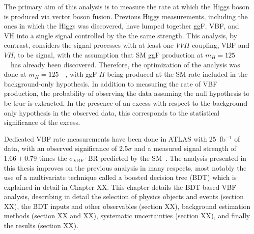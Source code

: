 
The primary aim of this analysis is to measure the rate at which the
Higgs boson is produced via vector boson fusion. Previous Higgs
measurements, including the ones in which the Higgs was discovered,
have lumped together ggF, VBF, and VH into a single signal controlled
by the the same strength. This analysis, by contrast, considers the
signal processes with at least one $VVH$ coupling, VBF and $VH$, to be
signal, with the assumption that SM ggF production at
$m_H=125$~\gev~has already been discovered. Therefore, the
optimization of the analysis was done at $m_H=125$~\gev~, with ggF $H$
being produced at the SM rate included in the background-only hypothesis. In
addition to measuring the rate of VBF production, the probability of
observing the data assuming the null hypothesis to be true is
extracted. In the presence of an excess with respect to the
background-only hypothesis in the observed data, this
corresponds to the statistical significance of the excess.

Dedicated VBF rate measurements have been done in ATLAS with
25~fb$^{-1}$ of data, with an observed significance of 2.5$\sigma$ and
a measured signal strength of $1.66\pm 0.79$ times the
$\sigma_{\mathrm{VBF}}\cdot{\mathrm{BR}}$ predicted by the
SM~\cite{bib:hww_moriond_2013}. The analysis presented in this thesis
improves on the previous analysis in
many respects, most notably the use of a multivariate technique called
a boosted decision tree (BDT) which is explained in detail in Chapter
XX. This chapter details the BDT-based VBF analysis, describing in
detail the selection of physics objects and events (section XX), the
BDT inputs and other observables (section XX), background estimation
methods (section XX and XX), systematic uncertainties (section XX),
and finally the results (section XX). 
